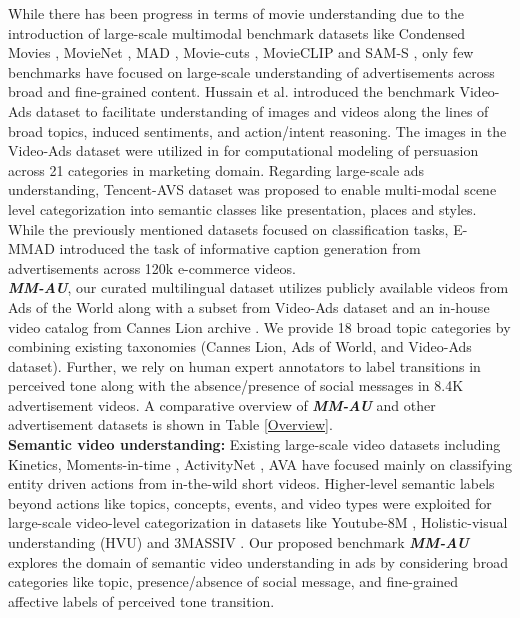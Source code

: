 While there has been progress in terms of movie understanding due to the introduction of large-scale multimodal benchmark datasets like Condensed Movies \cite{bain2020condensed}, MovieNet \cite{huang2020movienet}, MAD \cite{Soldan_2022_CVPR}, Movie-cuts \cite{Pardo2021MovieCutsAN}, MovieCLIP \cite{Bose_2023_WACV} and SAM-S \cite{Hebbar2023ADF}, only few benchmarks have focused on large-scale understanding of advertisements across broad and fine-grained content. Hussain et al. \cite{Hussain2017AutomaticUO} introduced the benchmark Video-Ads dataset to facilitate understanding of images and videos along the lines of broad topics, induced sentiments, and action/intent reasoning. The images in the Video-Ads dataset were utilized in \cite{Singla2022PersuasionSI} for computational modeling of persuasion across 21 categories in marketing domain. Regarding large-scale ads understanding, Tencent-AVS dataset \cite{Jiang2022TencentAA} was proposed to enable multi-modal scene level categorization into semantic classes like presentation, places and styles. While the previously mentioned datasets focused on classification tasks, E-MMAD \cite{Zhang2022AttractMT} introduced the task of informative caption generation from advertisements across 120k e-commerce videos.
\\
\textbf{\textit{MM-AU}}, our curated multilingual dataset utilizes publicly available videos from Ads of the World along with a subset from Video-Ads dataset and an in-house video catalog from Cannes Lion archive \cite{cannes-lions}. We provide 18 broad topic categories by combining existing taxonomies (Cannes Lion, Ads of World, and Video-Ads dataset). Further, we rely on human expert annotators to label transitions in perceived tone along with the absence/presence of social messages in 8.4K advertisement videos. A comparative overview of \textbf{\textit{MM-AU}} and other advertisement datasets is shown in Table \ref{Overview}.\\
\textbf{Semantic video understanding:}
Existing large-scale video datasets including Kinetics\cite{Carreira2017QuoVA}, Moments-in-time \cite{Monfort2018MomentsIT}, ActivityNet \cite{Heilbron2015ActivityNetAL}, AVA \cite{Gu2017AVAAV} have focused mainly on classifying entity driven actions from in-the-wild short videos. Higher-level semantic labels beyond actions like topics, concepts, events, and video types were exploited for large-scale video-level categorization in datasets like Youtube-8M \cite{AbuElHaija2016YouTube8MAL}, Holistic-visual understanding (HVU) \cite{diba2020large} and 3MASSIV \cite{Gupta20223MASSIVMM}. Our proposed benchmark \textbf{\textit{MM-AU}} explores the domain of semantic video understanding in ads by considering broad categories like topic, presence/absence of social message, and fine-grained affective labels of perceived tone transition.\\
